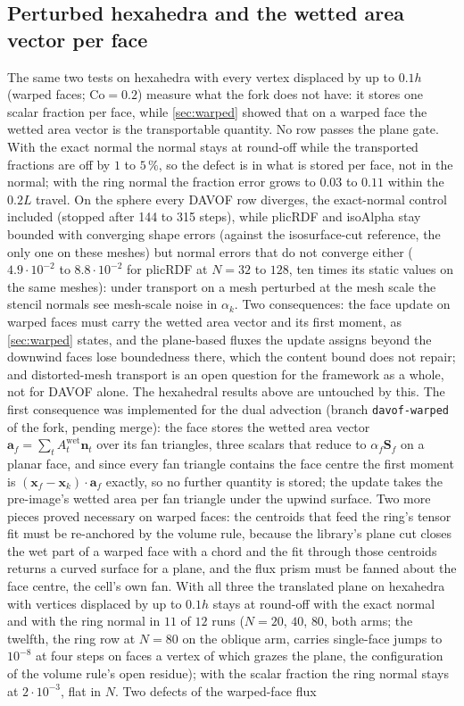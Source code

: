 \documentclass[preprint,12pt]{elsarticle}
\begin{document}
\subsection{Perturbed hexahedra and the wetted area vector per face}
\label{app:tpf-warped}

The same two tests on hexahedra with every vertex displaced by up to $0.1h$ (warped faces; $\mathrm{Co} = 0.2$) measure what the fork does not have: it stores one scalar fraction per face, while \cref{sec:warped} showed that on a warped face the wetted area vector is the transportable quantity. No row passes the plane gate. With the exact normal the normal stays at round-off while the transported fractions are off by $1$ to $5\,\%$, so the defect is in what is stored per face, not in the normal; with the ring normal the fraction error grows to $0.03$ to $0.11$ within the $0.2L$ travel. On the sphere every DAVOF row diverges, the exact-normal control included (stopped after 144 to 315 steps), while plicRDF and isoAlpha stay bounded with converging shape errors (against the isosurface-cut reference, the only one on these meshes) but normal errors that do not converge either ($4.9\cdot10^{-2}$ to $8.8\cdot10^{-2}$ for plicRDF at $N = 32$ to $128$, ten times its static values on the same meshes): under transport on a mesh perturbed at the mesh scale the stencil normals see mesh-scale noise in $\alpha_k$. Two consequences: the face update on warped faces must carry the wetted area vector and its first moment, as \cref{sec:warped} states, and the plane-based fluxes the update assigns beyond the downwind faces lose boundedness there, which the content bound does not repair; and distorted-mesh transport is an open question for the framework as a whole, not for DAVOF alone. The hexahedral results above are untouched by this. The first consequence was implemented for the dual advection (branch \texttt{davof-warped} of the fork, pending merge): the face stores the wetted area vector $\mathbf{a}_f = \sum_t A^{\mathrm{wet}}_t \mathbf{n}_t$ over its fan triangles, three scalars that reduce to $\alpha_f \mathbf{S}_f$ on a planar face, and since every fan triangle contains the face centre the first moment is $(\mathbf{x}_f - \mathbf{x}_k)\cdot\mathbf{a}_f$ exactly, so no further quantity is stored; the update takes the pre-image's wetted area per fan triangle under the upwind surface. Two more pieces proved necessary on warped faces: the centroids that feed the ring's tensor fit must be re-anchored by the volume rule, because the library's plane cut closes the wet part of a warped face with a chord and the fit through those centroids returns a curved surface for a plane, and the flux prism must be fanned about the face centre, the cell's own fan. With all three the translated plane on hexahedra with vertices displaced by up to $0.1h$ stays at round-off with the exact normal and with the ring normal in $11$ of $12$ runs ($N = 20$, $40$, $80$, both arms; the twelfth, the ring row at $N = 80$ on the oblique arm, carries single-face jumps to $10^{-8}$ at four steps on faces a vertex of which grazes the plane, the configuration of the volume rule's open residue); with the scalar fraction the ring normal stays at $2\cdot10^{-3}$, flat in $N$. Two defects of the warped-face flux 
\end{document}
